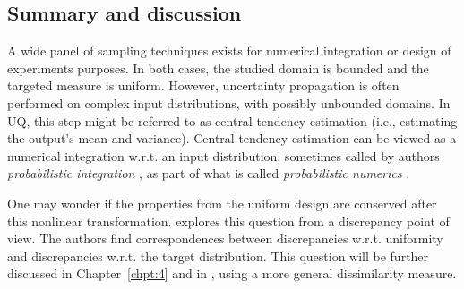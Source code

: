 \subsection{Summary and discussion}
A wide panel of sampling techniques exists for numerical integration or design of experiments purposes. 
In both cases, the studied domain is bounded and the targeted measure is uniform. 
However, uncertainty propagation is often performed on complex input distributions, with possibly unbounded domains. 
In UQ, this step might be referred to as central tendency estimation (i.e., estimating the output's mean and variance). 
Central tendency estimation can be viewed as a numerical integration w.r.t. an input distribution, sometimes called by authors \textit{probabilistic integration} \citep{briol_oates_2019}, as part of what is called \textit{probabilistic numerics} \citep{oates_sullivan_2019}.  


One may wonder if the properties from the uniform design are conserved after this nonlinear transformation. 
\citet{hickernell_2020} explores this question from a discrepancy point of view. 
The authors find correspondences between discrepancies w.r.t. uniformity and discrepancies w.r.t. the target distribution. 
This question will be further discussed in Chapter~\ref{chpt:4} and in \citet{fekhari_DCE_2023}, using a more general dissimilarity measure.


